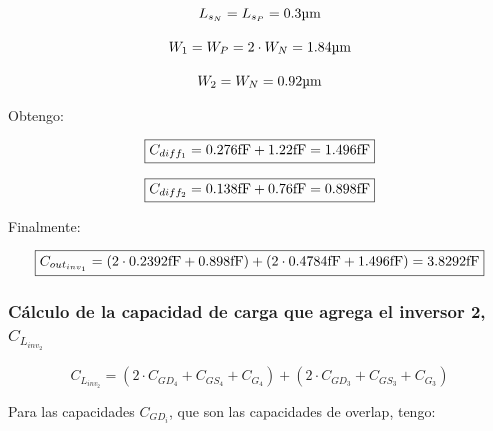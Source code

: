 \begin{equation*}
L_{s_{N}} = L_{s_{P}} = 0.3 \si[per-mode=symbol]{\micro\meter}
\end{equation*}

\begin{equation*}
W_{1}= W_{P} = 2 \cdot W_{N} = 1.84 \si[per-mode=symbol]{\micro\meter}
\end{equation*}


\begin{equation*}
W_{2}= W_{N} = 0.92 \si[per-mode=symbol]{\micro\meter}
\end{equation*}


Obtengo:

\begin{equation*}
\boxed{ C_{diff_{1}} = 0.276 \si[per-mode=symbol]{\femto\farad} + 1.22 \si[per-mode=symbol]{\femto\farad} = 1.496 \si[per-mode=symbol]{\femto\farad} }
\end{equation*}


\begin{equation*}
\boxed{ C_{diff_{2}} = 0.138 \si[per-mode=symbol]{\femto\farad} + 0.76 \si[per-mode=symbol]{\femto\farad} = 0.898 \si[per-mode=symbol]{\femto\farad} }
\end{equation*}



Finalmente:

\begin{equation*}
\boxed{ C_{out_{inv_{1}}} = \left( 2 \cdot 0.2392 \si[per-mode=symbol]{\femto\farad} + 0.898 \si[per-mode=symbol]{\femto\farad} \right) + \left( 2 \cdot 0.4784 \si[per-mode=symbol]{\femto\farad} + 1.496 \si[per-mode=symbol]{\femto\farad} \right) = 3.8292 \si[per-mode=symbol]{\femto\farad} }
\end{equation*}



\subsubsection{Cálculo de la capacidad de carga que agrega el inversor 2, $C_{L_{inv_{2}}}$}


\begin{equation*}
C_{L_{inv_{2}}} = \left( 2 \cdot C_{GD_{4}} + C_{GS_{4}} + C_{G_{4}} \right) + \left( 2 \cdot C_{GD_{3}} + C_{GS_{3}} + C_{G_{3}} \right)
\end{equation*}


Para las capacidades $C_{GD_{i}}$, que son las capacidades de overlap, tengo:

